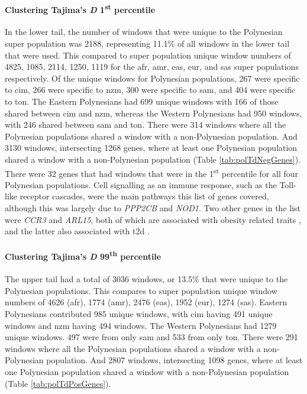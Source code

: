 \documentclass[twoside,openright]{report}
\let\oldparagraph\paragraph
\renewcommand{\paragraph}[1]{\oldparagraph{#1}\mbox{}}
\begin{document}
\paragraph{\texorpdfstring{Clustering Tajima's \emph{D}
1\textsuperscript{st}
percentile}{Clustering Tajima's D 1st percentile}}\label{clustering-tajimas-d-1st-percentile}

In the lower tail, the number of windows that were unique to the
Polynesian super population was 2188, representing 11.1\% of all windows
in the lower tail that were used. This compared to super population
unique window numbers of 4825, 1085, 2114, 1250, 1119 for the \gls{afr},
\gls{amr}, \gls{eas}, \gls{eur}, and \gls{sas} super populations
respectively. Of the unique windows for Polynesian populations, 267 were
specific to \gls{cim}, 266 were specific to \gls{nzm}, 300 were specific
to \gls{sam}, and 404 were specific to \gls{ton}. The Eastern
Polynesians had 699 unique windows with 166 of those shared between
\gls{cim} and \gls{nzm}, whereas the Western Polynesians had 950
windows, with 246 shared between \gls{sam} and \gls{ton}. There were 314
windows where all the Polynesian populations shared a window with a
non-Polynesian population. And 3130 windows, intersecting 1268 genes,
where at least one Polynesian population shared a window with a
non-Polynesian population (Table \ref{tab:polTdNegGenes}). There were 32
genes that had windows that were in the 1\textsuperscript{st} percentile
for all four Polynesian populations. Cell signalling as an immune
response, such as the Toll-like receptor cascades, were the main
pathways this list of genes covered, although this was largely due to
\emph{PPP2CB} and \emph{NOD1}. Two other genes in the list were
\emph{CCR3} and \emph{ARL15}, both of which are associated with obesity
related traits \citep{comuzzie2012novel, shungin2015genetic}, and the
latter also associated with \gls{t2d} \citep{mahajan2014genome}.

\paragraph{\texorpdfstring{Clustering Tajima's \emph{D}
99\textsuperscript{th}
percentile}{Clustering Tajima's D 99th percentile}}\label{clustering-tajimas-d-99th-percentile}

The upper tail had a total of 3036 windows, or 13.5\% that were unique
to the Polynesian populations. This compares to super population unique
window numbers of 4626 (\gls{afr}), 1774 (\gls{amr}), 2476 (\gls{eas}),
1952 (\gls{eur}), 1274 (\gls{sas}). Eastern Polynesians contributed 985
unique windows, with \gls{cim} having 491 unique windows and \gls{nzm}
having 494 windows. The Western Polynesians had 1279 unique windows. 497
were from only \gls{sam} and 533 from only \gls{ton}. There were 291
windows where all the Polynesian populations shared a window with a
non-Polynesian population. And 2807 windows, intersecting 1098 genes,
where at least one Polynesian population shared a window with a
non-Polynesian population (Table \ref{tab:polTdPosGenes}).
\end{document}
